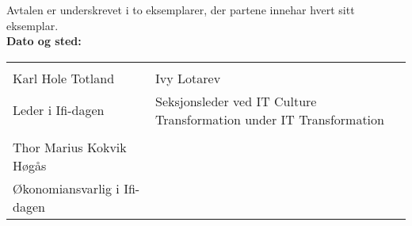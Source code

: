 \documentclass[norsk,a4paper]{article}
\begin{document}
\section*{}

Avtalen er underskrevet i to eksemplarer, der partene innehar hvert sitt
eksemplar.\\[2\bigskipamount]

\textbf{Dato og sted:}\\[5\bigskipamount]

\noindent
\begin{tabular}{@{}p{2.5in}p{2.5in}@{}}
    \hrulefill{} & \hrulefill{} \\
    Karl Hole Totland & Ivy Lotarev \\
    Leder i Ifi-dagen & Seksjonsleder ved IT Culture Transformation under IT
                        Transformation\\[5\bigskipamount]
    \hrulefill{} & \\
    Thor Marius Kokvik Høgås \\
    Økonomiansvarlig i Ifi-dagen
\end{tabular}
\end{document}
